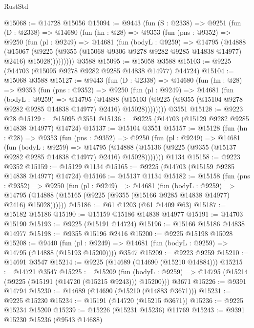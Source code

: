 \begin{lexlean}{RustStd}
\begin{coremodule}
@15068 := @14728 @15056
@15094 := @9443
    (fun (S : @2338) =>
    @9251
      (fun (D : @2338) =>
      @14680
        (fun (hn : @28) =>
        @9353
          (fun (pns : @9352) =>
          @9250
            (fun (pl : @9249) =>
            @14681
              (fun (bodyL : @9259) =>
              @14795
                (@14888
                  (@15067
                    (@9225
                      (@9355 (@15068 @9306 @9278 @9282 @9285 @14838 @14977) @2416)
                      @15028)))))))))
    @3588
@15095 := @15058 @3588
@15103 := @9225 (@14703 (@15095 @9278 @9282 @9285 @14838 @14977) @14724)
@15104 := @15068 @3588
@15127 := @9443
    (fun (D : @2338) =>
    @14680
      (fun (hn : @28) =>
      @9353
        (fun (pns : @9352) =>
        @9250
          (fun (pl : @9249) =>
          @14681
            (fun (bodyL : @9259) =>
            @14795
              (@14888
                (@15103 (@9225 (@9355 (@15104 @9278 @9282 @9285 @14838 @14977) @2416) @15028))))))))
    @3551
@15128 := @9223 @28
@15129 := @15095 @3551
@15136 := @9225 (@14703 (@15129 @9282 @9285 @14838 @14977) @14724)
@15137 := @15104 @3551
@15157 := @15128
    (fun (hn : @28) =>
    @9353
      (fun (pns : @9352) =>
      @9250
        (fun (pl : @9249) =>
        @14681
          (fun (bodyL : @9259) =>
          @14795
            (@14888 (@15136 (@9225 (@9355 (@15137 @9282 @9285 @14838 @14977) @2416) @15028)))))))
    @1134
@15158 := @9223 @9352
@15159 := @15129 @1134
@15165 := @9225 (@14703 (@15159 @9285 @14838 @14977) @14724)
@15166 := @15137 @1134
@15182 := @15158
    (fun (pns : @9352) =>
    @9250
      (fun (pl : @9249) =>
      @14681
        (fun (bodyL : @9259) =>
        @14795 (@14888 (@15165 (@9225 (@9355 (@15166 @9285 @14838 @14977) @2416) @15028))))))
@15186 := @61 @1203 (@61 @1409 @63)
@15187 := @15182 @15186
@15190 := @15159 @15186 @14838 @14977
@15191 := @14703 @15190
@15193 := @9225 (@15191 @14724)
@15196 := @15166 @15186 @14838 @14977
@15198 := @9355 @15196 @2416
@15200 := @9225 @15198 @15028
@15208 := @9440
    (fun (pl : @9249) => @14681 (fun (bodyL : @9259) => @14795 (@14888 (@15193 @15200))))
    @3547
@15209 := @9223 @9259
@15210 := @14691 @3547
@15214 := @9225 (@14689 (@14690 (@15210 @14884)))
@15215 := @14721 @3547
@15225 := @15209
    (fun (bodyL : @9259) => @14795 (@15214 (@9225 (@15191 (@14720 (@15215 @9243))) @15200)))
    @3671
@15226 := @9391 @14794
@15230 := @14689 (@14690 (@15210 (@14883 @3671)))
@15231 := @9225 @15230
@15234 := @15191 (@14720 (@15215 @3671))
@15236 := @9225 @15234 @15200
@15239 := @15226 (@15231 @15236) @11769
@15243 := @9391 @15230 @15236 (@9543 @14688)

\end{coremodule}
\end{lexlean}
